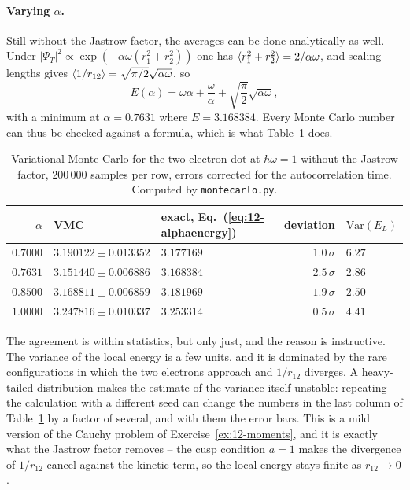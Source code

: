 \paragraph{Varying $\alpha$.}
Still without the Jastrow factor, the averages can be done analytically as
well.  Under $|\Psi_T|^2\propto\exp(-\alpha\omega(r_1^2+r_2^2))$ one has
$\langle r_1^2+r_2^2 \rangle=2/\alpha\omega$, and scaling lengths gives
$\langle 1/r_{12} \rangle=\sqrt{\pi/2}\sqrt{\alpha\omega}$, so
\begin{equation}
  E(\alpha) = \omega\alpha + \frac{\omega}{\alpha}
   + \sqrt{\frac{\pi}{2}}\sqrt{\alpha\omega},
  \label{eq:12-alphaenergy}
\end{equation}
with a minimum at $\alpha=0.7631$ where $E=3.168384$.  Every Monte Carlo
number can thus be checked against a formula, which is what
Table~\ref{tab:12-vmc} does.

\begin{table}[h]
\centering
\renewcommand{\arraystretch}{1.25}
\setlength{\tabcolsep}{10pt}
\begin{tabular}{rllrl}
\toprule
$\alpha$ & VMC & exact, Eq.~(\ref{eq:12-alphaenergy}) & deviation &
$\mathrm{Var}(E_L)$\\
\midrule
$0.7000$ & $3.190122\pm0.013352$ & $3.177169$ & $1.0\,\sigma$ & $6.27$\\
$0.7631$ & $3.151440\pm0.006886$ & $3.168384$ & $2.5\,\sigma$ & $2.86$\\
$0.8500$ & $3.168811\pm0.006859$ & $3.181969$ & $1.9\,\sigma$ & $2.50$\\
$1.0000$ & $3.247816\pm0.010337$ & $3.253314$ & $0.5\,\sigma$ & $4.41$\\
\bottomrule
\end{tabular}
\caption{Variational Monte Carlo for the two-electron dot at $\hbar\omega=1$
without the Jastrow factor, $200\,000$ samples per row, errors corrected for
the autocorrelation time.  Computed by \texttt{montecarlo.py}.}
\label{tab:12-vmc}
\end{table}

The agreement is within statistics, but only just, and the reason is
instructive.  The variance of the local energy is a few units, and it is
dominated by the rare configurations in which the two electrons approach and
$1/r_{12}$ diverges.  A heavy-tailed distribution makes the estimate of the
variance itself unstable: repeating the calculation with a different seed can
change the numbers in the last column of Table~\ref{tab:12-vmc} by a factor of
several, and with them the error bars.  This is a mild version of the Cauchy
problem of Exercise~\ref{ex:12-moments}, and it is exactly what the Jastrow
factor removes -- the cusp condition $a=1$ makes the divergence of $1/r_{12}$
cancel against the kinetic term, so the local energy stays finite as
$r_{12}\to0$.

